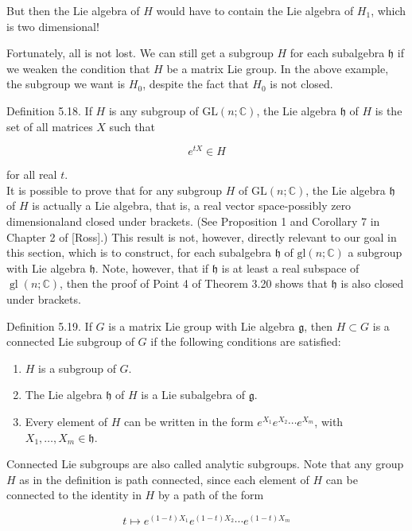 \documentclass[10pt, letterpaper]{article}
\begin{document}
But then the Lie algebra of $H$ would have to contain the Lie algebra of $H_{1}$, which is two dimensional!

Fortunately, all is not lost. We can still get a subgroup $H$ for each subalgebra $\mathfrak{h}$ if we weaken the condition that $H$ be a matrix Lie group. In the above example, the subgroup we want is $H_{0}$, despite the fact that $H_{0}$ is not closed.

Definition 5.18. If $H$ is any subgroup of $\mathrm{GL}(n ; \mathbb{C})$, the Lie algebra $\mathfrak{h}$ of $H$ is the set of all matrices $X$ such that

$$
e^{t X} \in H
$$

for all real $t$.\\
It is possible to prove that for any subgroup $H$ of $\mathrm{GL}(n ; \mathbb{C})$, the Lie algebra $\mathfrak{h}$ of $H$ is actually a Lie algebra, that is, a real vector space-possibly zero dimensionaland closed under brackets. (See Proposition 1 and Corollary 7 in Chapter 2 of [Ross].) This result is not, however, directly relevant to our goal in this section, which is to construct, for each subalgebra $\mathfrak{h}$ of $\mathrm{gl}(n ; \mathbb{C})$ a subgroup with Lie algebra $\mathfrak{h}$. Note, however, that if $\mathfrak{h}$ is at least a real subspace of $\operatorname{gl}(n ; \mathbb{C})$, then the proof of Point 4 of Theorem 3.20 shows that $\mathfrak{h}$ is also closed under brackets.

Definition 5.19. If $G$ is a matrix Lie group with Lie algebra $\mathfrak{g}$, then $H \subset G$ is a connected Lie subgroup of $G$ if the following conditions are satisfied:

\begin{enumerate}
  \item $H$ is a subgroup of $G$.
  \item The Lie algebra $\mathfrak{h}$ of $H$ is a Lie subalgebra of $\mathfrak{g}$.
  \item Every element of $H$ can be written in the form $e^{X_{1}} e^{X_{2}} \cdots e^{X_{m}}$, with $X_{1}, \ldots, X_{m} \in \mathfrak{h}$.
\end{enumerate}

Connected Lie subgroups are also called analytic subgroups. Note that any group $H$ as in the definition is path connected, since each element of $H$ can be connected to the identity in $H$ by a path of the form

$$
t \mapsto e^{(1-t) X_{1}} e^{(1-t) X_{2}} \cdots e^{(1-t) X_{m}}
$$
\end{document}
